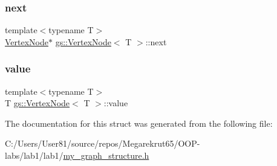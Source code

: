\mbox{\label{structgs_1_1_vertex_node_a7fc257ce53eb77e180531b39bb303250}} 
\subsubsection{\texorpdfstring{next}{next}}
{\footnotesize\ttfamily template$<$typename T$>$ \\
\mbox{\hyperlink{structgs_1_1_vertex_node}{Vertex\+Node}}$\ast$ \mbox{\hyperlink{structgs_1_1_vertex_node}{gs\+::\+Vertex\+Node}}$<$ T $>$\+::next}

\mbox{\label{structgs_1_1_vertex_node_a0bc246c7c0bfbea6354d90c704761fd3}} 
\subsubsection{\texorpdfstring{value}{value}}
{\footnotesize\ttfamily template$<$typename T$>$ \\
T \mbox{\hyperlink{structgs_1_1_vertex_node}{gs\+::\+Vertex\+Node}}$<$ T $>$\+::value}



The documentation for this struct was generated from the following file\+:\begin{DoxyCompactItemize}
\item 
C\+:/\+Users/\+User81/source/repos/\+Megarekrut65/\+O\+O\+P-\/labs/lab1/lab1/\mbox{\hyperlink{my__graph__structure_8h}{my\+\_\+graph\+\_\+structure.\+h}}\end{DoxyCompactItemize}
